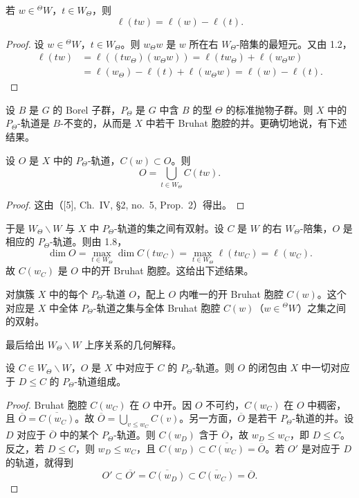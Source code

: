 \begin{lemma}\label{lem:06.1.8}
若 $w\in{}^{\Theta}W$，$t\in W_\Theta$，则
$$\ell(tw)=\ell(w)-\ell(t).$$
\end{lemma}

\begin{proof}
设 $w\in{}^{\Theta}W$，$t\in W_\Theta$。则 $w_\Theta w$ 是 $w$ 所在右 $W_\Theta$-陪集的最短元。又由 1.2，
\begin{align*}
\ell(tw)&=\ell((tw_\Theta)(w_\Theta w))=\ell(tw_\Theta)+\ell(w_\Theta w)\\
&=\ell(w_\Theta)-\ell(t)+\ell(w_\Theta w)=\ell(w)-\ell(t).
\end{align*}
\end{proof}

设 $B$ 是 $G$ 的 Borel 子群，$P_\Theta$ 是 $G$ 中含 $B$ 的型 $\Theta$ 的标准抛物子群。则 $X$ 中的 $P_\Theta$-轨道是 $B$-不变的，从而是 $X$ 中若干 Bruhat 胞腔的并。更确切地说，有下述结果。

\begin{lemma}\label{lem:06.1.9}
设 $O$ 是 $X$ 中的 $P_\Theta$-轨道，$C(w)\subset O$。则
$$O=\bigcup_{t\in W_\Theta}C(tw).$$
\end{lemma}

\begin{proof}
这由（[5], Ch.~IV, \S 2, no.~5, Prop.~2）得出。
\end{proof}

于是 $W_\Theta\backslash W$ 与 $X$ 中 $P_\Theta$-轨道的集之间有双射。设 $C$ 是 $W$ 的右 $W_\Theta$-陪集，$O$ 是相应的 $P_\Theta$-轨道。则由 1.8，
$$\dim O=\max_{t\in W_\Theta}\dim C(tw_C)=\max_{t\in W_\Theta}\ell(tw_C)=\ell(w_C).$$
故 $C(w_C)$ 是 $O$ 中的开 Bruhat 胞腔。这给出下述结果。

\begin{proposition}\label{prop:06.1.10}
对旗簇 $X$ 中的每个 $P_\Theta$-轨道 $O$，配上 $O$ 内唯一的开 Bruhat 胞腔 $C(w)$。这个对应是 $X$ 中全体 $P_\Theta$-轨道之集与全体 Bruhat 胞腔 $C(w)$（$w\in{}^{\Theta}W$）之集之间的双射。
\end{proposition}

最后给出 $W_\Theta\backslash W$ 上序关系的几何解释。

\begin{proposition}\label{prop:06.1.11}
设 $C\in W_\Theta\backslash W$，$O$ 是 $X$ 中对应于 $C$ 的 $P_\Theta$-轨道。则 $O$ 的闭包由 $X$ 中一切对应于 $D\le C$ 的 $P_\Theta$-轨道组成。
\end{proposition}

\begin{proof}
Bruhat 胞腔 $C(w_C)$ 在 $O$ 中开。因 $O$ 不可约，$C(w_C)$ 在 $O$ 中稠密，且 $\overline O=\overline{C(w_C)}$。故 $\overline O=\bigcup_{v\le w_C}C(v)$。另一方面，$\overline O$ 是若干 $P_\Theta$-轨道的并。设 $D$ 对应于 $\overline O$ 中的某个 $P_\Theta$-轨道。则 $C(w_D)$ 含于 $\overline O$，故 $w_D\le w_C$，即 $D\le C$。反之，若 $D\le C$，则 $w_D\le w_C$，且 $C(w_D)\subset\overline{C(w_C)}=\overline O$。若 $O'$ 是对应于 $D$ 的轨道，就得到
$$O'\subset\overline{O'}=\overline{C(w_D)}\subset\overline{C(w_C)}=\overline O.$$
\end{proof}

